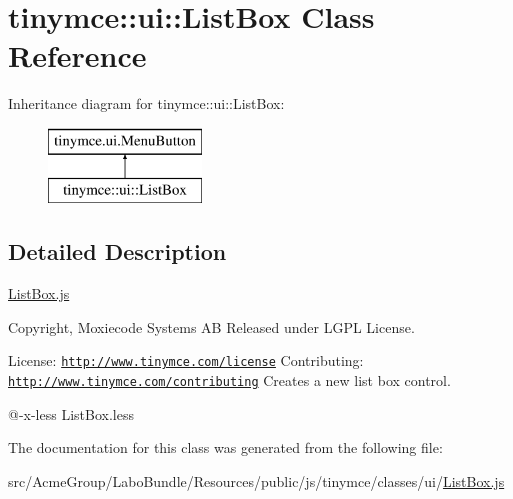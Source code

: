 \hypertarget{classtinymce_1_1ui_1_1_list_box}{\section{tinymce\+:\+:ui\+:\+:List\+Box Class Reference}
\label{classtinymce_1_1ui_1_1_list_box}
}
Inheritance diagram for tinymce\+:\+:ui\+:\+:List\+Box\+:\begin{figure}[H]
\begin{center}
\leavevmode
\includegraphics[height=2.000000cm]{classtinymce_1_1ui_1_1_list_box}
\end{center}
\end{figure}


\subsection{Detailed Description}
\hyperlink{_list_box_8js}{List\+Box.\+js}

Copyright, Moxiecode Systems A\+B Released under L\+G\+P\+L License.

License\+: \href{http://www.tinymce.com/license}{\tt http\+://www.\+tinymce.\+com/license} Contributing\+: \href{http://www.tinymce.com/contributing}{\tt http\+://www.\+tinymce.\+com/contributing} Creates a new list box control.

@-\/x-\/less List\+Box.\+less 

The documentation for this class was generated from the following file\+:\begin{DoxyCompactItemize}
\item 
src/\+Acme\+Group/\+Labo\+Bundle/\+Resources/public/js/tinymce/classes/ui/\hyperlink{_list_box_8js}{List\+Box.\+js}\end{DoxyCompactItemize}
